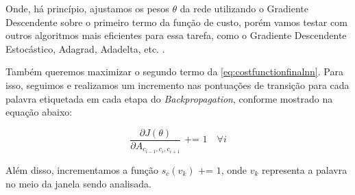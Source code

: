Onde, há princípio, ajustamos os pesos $\theta$ da rede utilizando o Gradiente Descendente sobre o primeiro termo da função de custo, porém vamos testar com outros algoritmos mais eficientes para essa tarefa, como o Gradiente Descendente Estocástico, Adagrad, Adadelta, etc. \cite{Bengio-et-al-2015-Book}. 

Também queremos maximizar o segundo termo da \autoref{eq:costfunctionfinalnn}. Para isso, seguimos \cite{fonseca2015evaluating} e realizamos um incremento nas pontuações de transição para cada palavra etiquetada em cada etapa do \textit{Backpropagation}, conforme mostrado na equação abaixo:

\begin{equation}\label{eq:gradientsfinalnn}
\frac{\partial J(\theta)}{\partial A_{c_{i-1}, c_{i}, c_{i+1}}} \text{ += } 1 \quad \forall i
\end{equation}


Além disso, incrementamos a função $s_c(v_k) \text{ += } 1$, onde $v_k$ representa a palavra no meio da janela sendo analisada.